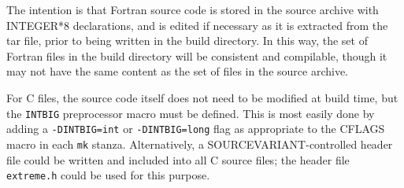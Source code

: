 \documentclass[twoside,11pt]{article}
\renewcommand{\_}{\texttt{\symbol{95}}}
\newcommand{\file}[1]{{\tt #1}}
\newcommand{\cc}[1]{{\tt #1}}
\begin{document}
The intention is that Fortran source code is stored in the source 
archive with INTEGER*8 declarations,
and is edited if necessary 
as it is extracted from the tar file, prior to being
written in the build directory.
In this way, the set of Fortran files in the build directory 
will be consistent and compilable, 
though it 
may not have the same content as the set of files in the source archive.

For C files, the source code itself does not need to be modified at
build time, but the \cc{INT\_BIG} preprocessor macro must be defined.
This is most easily done by adding a \cc{-DINT\_BIG=int} or 
\cc{-DINT\_BIG=long} flag as appropriate to the
CFLAGS macro in each \file{mk} stanza.
Alternatively, a SOURCE\_VARIANT-controlled header file could be
written and included into all C source files;
the header file \file{extreme.h} could be used
for this purpose.
\end{document}
